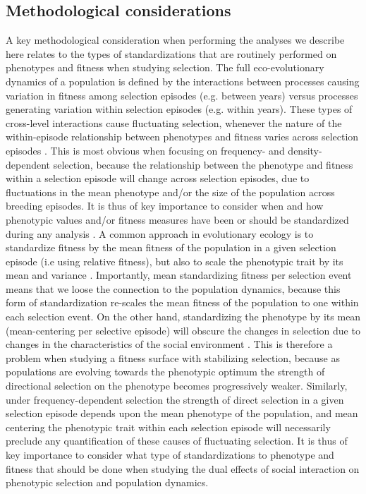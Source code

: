 \documentclass{article}
\begin{document}
\subsection{Methodological considerations}
 A key methodological consideration when performing the analyses we describe here relates to the types of standardizations that are routinely performed on phenotypes and fitness when studying selection. The full eco-evolutionary dynamics of a population is defined by the interactions between processes causing variation in fitness among selection episodes (e.g. between years) versus processes generating variation within selection episodes (e.g. within years). These types of cross-level interactions cause fluctuating selection, whenever the nature of the within-episode relationship between phenotypes and fitness varies across selection episodes \citep{Araya-Ajoy2020}. This is most obvious when focusing on frequency- and density-dependent selection, because the relationship between the phenotype and fitness within a selection episode will change across selection episodes, due to fluctuations in the mean phenotype and/or the size of the population across breeding episodes. It is thus of key importance to consider when and how phenotypic values and/or fitness measures have been or should be standardized during any analysis \citep{DeLisle2017}. A common approach in evolutionary ecology is to standardize fitness by the mean fitness of the population in a given selection episode (i.e using relative fitness), but also to scale the phenotypic trait by its mean and variance \citep{Dingemanse2021}. Importantly, mean standardizing fitness per selection event means that we loose the connection to the population dynamics, because this form of standardization re-scales the mean fitness of the population to one within each selection event. On the other hand, standardizing the phenotype by its mean (mean-centering per selective episode) will obscure the changes in selection due to changes in the characteristics of the social environment \citep{Araya-Ajoy2020}. This is therefore a problem when studying a fitness surface with stabilizing selection, because as populations are evolving towards the phenotypic optimum the strength of directional selection on the phenotype becomes progressively weaker. Similarly, under frequency-dependent selection the strength of direct selection in a given selection episode depends upon the mean phenotype of the population, and mean centering the phenotypic trait within each selection episode will necessarily preclude any quantification of these causes of fluctuating selection. It is thus of key importance to consider what type of standardizations to phenotype and fitness that should be done when studying the dual effects of social interaction on phenotypic selection and population dynamics. 
\end{document}

